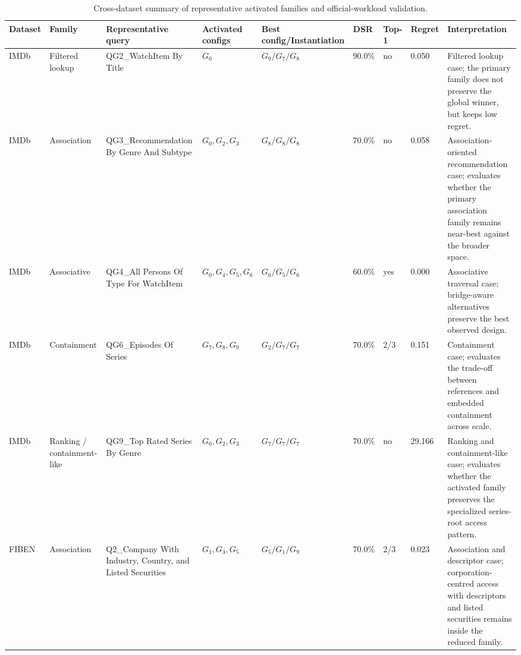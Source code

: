 \begin{table}
\centering
\caption{Cross-dataset summary of representative activated families and official-workload validation.}
\label{tab:cross_dataset_summary}
\scriptsize
\setlength{\tabcolsep}{3.2pt}
\begin{tabular}{p{1.3cm} 
                p{1.6cm} 
                p{2.3cm} 
                p{1.7cm} 
                p{1.5cm} 
                p{1.1cm} 
                p{1.1cm} 
                p{1.2cm} 
                p{3.0cm}}
\toprule
\textbf{Dataset} & 
\textbf{Family} & 
\textbf{Representative query} & 
\textbf{Activated configs} & 
\textbf{Best config/Instantiation} & 
\textbf{DSR} & 
\textbf{Top-1} & 
\textbf{Regret} & 
\textbf{Interpretation} \\
\midrule

IMDb & 
Filtered lookup & 
QG2\_WatchItem By Title & 
$G_0$ & 
$G_9 / G_7 / G_8$ & 
90.0\% & 
no & 
0.050 & 
Filtered lookup case; the primary family does not preserve the global winner, but keeps low regret. \\

IMDb & 
Association & 
QG3\_Recommendation By Genre And Subtype & 
$G_0, G_2, G_3$ & 
$G_8 / G_8 / G_8$ & 
70.0\% & 
no & 
0.058 & 
Association-oriented recommendation case; evaluates whether the primary association family remains near-best against the broader space. \\

IMDb & 
Associative & 
QG4\_All Persons Of Type For WatchItem & 
$G_0, G_4, G_5, G_6$ & 
$G_6 / G_5 / G_6$ & 
60.0\% & 
yes & 
0.000 & 
Associative traversal case; bridge-aware alternatives preserve the best observed design. \\

IMDb & 
Containment & 
QG6\_Episodes Of Series & 
$G_7, G_8, G_9$ & 
$G_2 / G_7 / G_7$ & 
70.0\% & 
2/3 & 
0.151 & 
Containment case; evaluates the trade-off between references and embedded containment across scale. \\

IMDb & 
Ranking / containment-like & 
QG9\_Top Rated Series By Genre & 
$G_0, G_2, G_3$ & 
$G_7 / G_7 / G_7$ & 
70.0\% & 
no & 
29.166 & 
Ranking and containment-like case; evaluates whether the activated family preserves the specialized series-root access pattern. \\

FIBEN & 
Association & 
Q2\_Company With Industry, Country, and Listed Securities & 
$G_1, G_3, G_5$ & 
$G_5 / G_1 / G_9$ & 
70.0\% & 
2/3 & 
0.023 & 
Association and descriptor case; corporation-centred access with descriptors and listed securities remains inside the reduced family. \\


\end{tabular}
\end{table}
